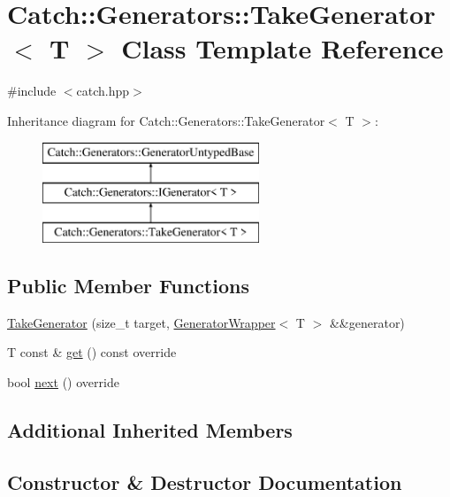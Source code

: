 \hypertarget{class_catch_1_1_generators_1_1_take_generator}{}\section{Catch\+:\+:Generators\+:\+:Take\+Generator$<$ T $>$ Class Template Reference}
\label{class_catch_1_1_generators_1_1_take_generator}


{\ttfamily \#include $<$catch.\+hpp$>$}

Inheritance diagram for Catch\+:\+:Generators\+:\+:Take\+Generator$<$ T $>$\+:\begin{figure}[H]
\begin{center}
\leavevmode
\includegraphics[height=3.000000cm]{class_catch_1_1_generators_1_1_take_generator}
\end{center}
\end{figure}
\subsection*{Public Member Functions}
\begin{DoxyCompactItemize}
\item 
\mbox{\hyperlink{class_catch_1_1_generators_1_1_take_generator_aacef789c01a86246249c88a184268c65}{Take\+Generator}} (size\+\_\+t target, \mbox{\hyperlink{class_catch_1_1_generators_1_1_generator_wrapper}{Generator\+Wrapper}}$<$ T $>$ \&\&generator)
\item 
T const  \& \mbox{\hyperlink{class_catch_1_1_generators_1_1_take_generator_aa4d2560f2066ec2eb4a351d62c107c78}{get}} () const override
\item 
bool \mbox{\hyperlink{class_catch_1_1_generators_1_1_take_generator_ae343f3e28fe04e0a20d6fdf69bfb4c78}{next}} () override
\end{DoxyCompactItemize}
\subsection*{Additional Inherited Members}


\subsection{Constructor \& Destructor Documentation}
\mbox{\label{class_catch_1_1_generators_1_1_take_generator_aacef789c01a86246249c88a184268c65}} 
